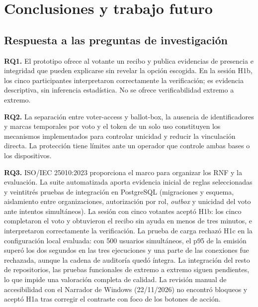 \chapter{Conclusiones y trabajo futuro}
\label{cap:conclusiones}

\section{Respuesta a las preguntas de investigación}
\textbf{RQ1.} El prototipo ofrece al votante un recibo y publica evidencias de
presencia e integridad que pueden explicarse sin revelar la opción escogida.
En la sesión H1b, los cinco participantes interpretaron correctamente la
verificación; es evidencia descriptiva, sin inferencia estadística. No se
ofrece verificabilidad extremo a extremo.

\textbf{RQ2.} La separación entre voter-access y ballot-box, la ausencia de
identificadores y marcas temporales por voto y el token de un solo uso
constituyen los mecanismos implementados para controlar unicidad y reducir la
vinculación directa. La protección tiene límites ante un operador que controle
ambas bases o los dispositivos.

\textbf{RQ3.} ISO/IEC 25010:2023 proporciona el marco para organizar los RNF y
la evaluación. La suite automatizada aporta evidencia inicial de reglas
seleccionadas y veintitrés pruebas de integración en PostgreSQL (migraciones y
esquema, aislamiento entre organizaciones, autorización por rol, \emph{outbox} y unicidad del voto
ante intentos simultáneos).
La sesión con cinco votantes aceptó H1b: los cinco completaron el voto y
obtuvieron el recibo sin ayuda en menos de tres minutos, e interpretaron
correctamente la verificación. La prueba de carga rechazó H1c en la
configuración local evaluada: con 500 usuarios simultáneos, el p95 de la
emisión superó los dos segundos en las tres ejecuciones y una parte de las
conexiones fue rechazada, aunque la cadena de auditoría quedó íntegra. La
integración del resto de repositorios, las pruebas funcionales de extremo a
extremo siguen pendientes, lo que impide una valoración completa de calidad. La revisión manual de accesibilidad
con el Narrador de Windows (22/11/2026) no encontró bloqueos y aceptó H1a tras corregir el contraste con foco
de los botones de acción.

